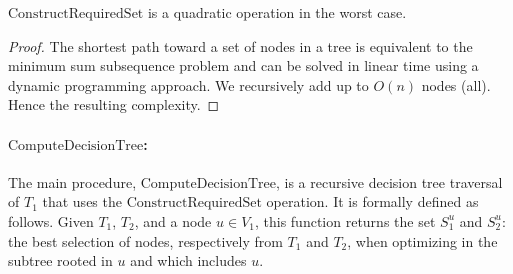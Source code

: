 			\begin{proposition}\label{prop:constructFuncQuadratic}
				$\text{ConstructRequiredSet}$ is a quadratic operation in the worst case.
			\end{proposition}
			\begin{proof}
				The shortest path toward a set of nodes in a tree is equivalent to the minimum sum subsequence problem and can be solved in linear time using a dynamic programming approach.
				We recursively add up to $O(n)$ nodes (all).
				Hence the resulting complexity.
			\end{proof}

			\paragraph{$\text{ComputeDecisionTree}$:}
			The main procedure, $\text{ComputeDecisionTree}$,  is a recursive decision tree traversal of $T_1$ that uses the $\text{ConstructRequiredSet}$ operation.
			It is formally defined as follows.
			Given $T_1$, $T_2$, and a node $u \in V_1$, this function returns the set $S^u_1$ and $S^u_2$: the best selection of nodes, respectively from $T_1$ and $T_2$, when optimizing in the subtree rooted in $u$ and which includes $u$.
